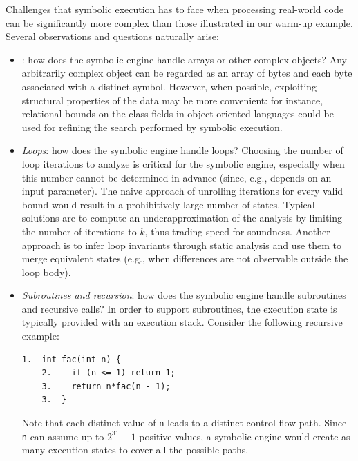Challenges that symbolic execution has to face when processing real-world code can be significantly more complex than those illustrated in our warm-up example. Several observations and questions naturally arise:

\begin{itemize}

\item {}: how does the symbolic engine handle arrays or other complex objects?
Any arbitrarily complex object can be regarded as an array of bytes and each byte associated with a distinct symbol. However, when possible, exploiting structural properties of the data may be more convenient: for instance, relational bounds on the class fields in object-oriented languages could be used for refining the search performed by symbolic execution.
\vspace{1mm}

  \item {\em Loops}: how does the symbolic engine handle loops?
Choosing the number of loop iterations to analyze is critical for the symbolic engine, especially when this number cannot be determined in advance (since, e.g., depends on an input parameter). The naive approach of unrolling iterations for every valid bound would result in a prohibitively large number of states. Typical solutions are to compute an underapproximation of the analysis by limiting the number of iterations to $k$, thus trading speed for soundness. Another approach is to infer loop invariants through static analysis  and use them to merge equivalent states (e.g., when differences are not observable outside the loop body).
\vspace{1mm}

  \item {\em Subroutines and recursion}: how does the symbolic engine handle subroutines and recursive calls?
In order to support subroutines, the execution state is typically provided with an execution stack. Consider the following recursive example:
    \begin{lstlisting}[basicstyle=\ttfamily\small]
    1.  int fac(int n) {
    2.    if (n <= 1) return 1;
    3.    return n*fac(n - 1);
    3.  }
    \end{lstlisting}
Note that each distinct value of {\tt n} leads to a distinct control flow path. Since {\tt n} can assume up to  $2^{31} - 1$ positive values, a symbolic engine would create as many execution states to cover all the possible paths.
 \vspace{1mm}


\end{itemize}
